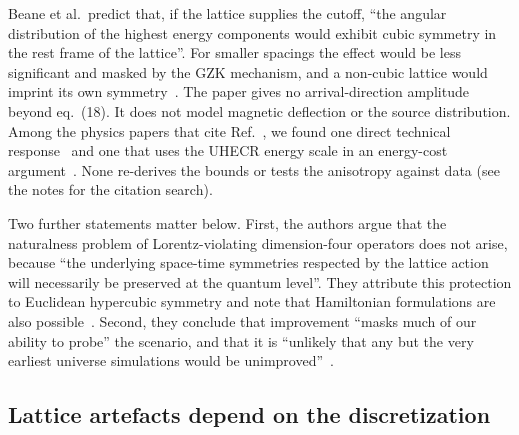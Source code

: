 Beane et al.\ predict that, if the lattice supplies the cutoff, ``the angular distribution of the highest energy components would exhibit cubic symmetry in the rest frame of the lattice''. For smaller spacings the effect would be less significant and masked by the GZK mechanism, and a non-cubic lattice would imprint its own symmetry~\cite[Sec.~IV]{Beane2014constraints}. The paper gives no arrival-direction amplitude beyond eq.~(18). It does not model magnetic deflection or the source distribution. Among the physics papers that cite Ref.~\cite{Beane2014constraints}, we found one direct technical response~\cite{Andersen2012lorentz} and one that uses the UHECR energy scale in an energy-cost argument~\cite{Vazza2025astrophysical}. None re-derives the bounds or tests the anisotropy against data (see the notes for the citation search).

Two further statements matter below. First, the authors argue that the naturalness problem of Lorentz-violating dimension-four operators does not arise, because ``the underlying space-time symmetries respected by the lattice action will necessarily be preserved at the quantum level''. They attribute this protection to Euclidean hypercubic symmetry and note that Hamiltonian formulations are also possible~\cite[Sec.~I and fn.~3]{Beane2014constraints}. Second, they conclude that improvement ``masks much of our ability to probe'' the scenario, and that it is ``unlikely that any but the very earliest universe simulations would be unimproved''~\cite[Sec.~V]{Beane2014constraints}.

\subsection{Lattice artefacts depend on the discretization}
\label{sec:lattice-liv:artefacts}

